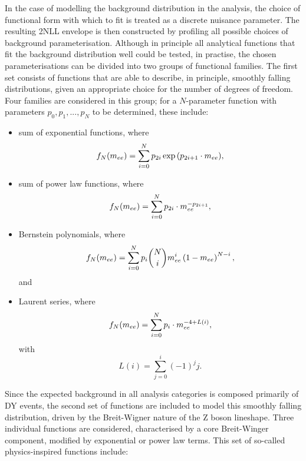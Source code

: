 In the case of modelling the background \mee distribution in the \Hee analysis, the choice of functional form with which to fit is treated as a discrete nuisance parameter. The resulting 2NLL envelope is then constructed by profiling all possible choices of background parameterisation.
Although in principle all analytical functions that fit the background \mee distribution well could be tested, in practise, the chosen parameterisations can be divided into two groups of functional families. The first set consists of functions that are able to describe, in principle, smoothly falling distributions, given an appropriate choice for the number of degrees of freedom. Four families are considered in this group; for a $N$-parameter function with parameters $p_0, p_1, ..., p_N$ to be determined, these include:
 
\begin{itemize}
\item sum of exponential functions, where
\begin{equation*}
f_N(\mee) = \sum_{i=0}^{N} p_{2i}\exp{\left(p_{2i+1}\cdot\mee\right)},
\end{equation*}
\item sum of power law functions, where
\begin{equation*}
f_N(m_{ee}) = \sum_{i=0}^{N} p_{2i}\cdot m_{ee}^{-p_{2i+1}},
\end{equation*}
\item Bernstein polynomials, where
\begin{equation*}
f_N(m_{ee}) = \sum_{i=0}^{N} p_{i}\binom{N}{i}m_{ee}^{i}\left(1-m_{ee}\right)^{N-i},
\end{equation*} and
\item Laurent series, where
\begin{equation*}
f_N(m_{ee}) = \sum_{i=0}^{N} p_{i}\cdot m_{ee}^{-4 + L(i)},
\end{equation*}
with
\begin{equation*}
L(i) = \sum_{j=0}^{i}(-1)^j j .
\end{equation*}
\end{itemize}

\noindent Since the expected background in all analysis categories is composed primarily of DY events, the second set of functions are included to model this smoothly falling distribution, driven by the Breit-Wigner nature of the $\mathrm{Z}$ boson lineshape. Three individual functions are considered, characterised by a core Breit-Winger component, modified by exponential or power law terms. This set of so-called physics-inspired functions include:

